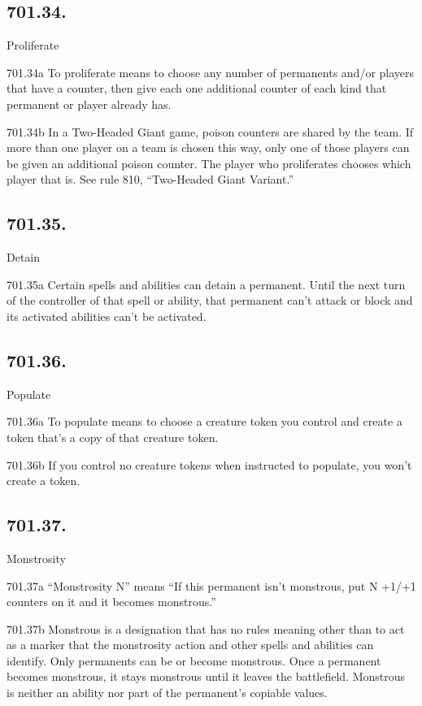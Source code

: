 \subsection*{701.34.}
Proliferate

701.34a To proliferate means to choose any number of permanents and/or players that have a counter, then give each one additional counter of each kind that permanent or player already has.

701.34b In a Two-Headed Giant game, poison counters are shared by the team. If more than one player on a team is chosen this way, only one of those players can be given an additional poison counter. The player who proliferates chooses which player that is. See rule 810, “Two-Headed Giant Variant.”

\subsection*{701.35.}
Detain

701.35a Certain spells and abilities can detain a permanent. Until the next turn of the controller of that spell or ability, that permanent can’t attack or block and its activated abilities can’t be activated.

\subsection*{701.36.}
Populate

701.36a To populate means to choose a creature token you control and create a token that’s a copy of that creature token.

701.36b If you control no creature tokens when instructed to populate, you won’t create a token.

\subsection*{701.37.}
Monstrosity

701.37a “Monstrosity N” means “If this permanent isn’t monstrous, put N +1/+1 counters on it and it becomes monstrous.”

701.37b Monstrous is a designation that has no rules meaning other than to act as a marker that the monstrosity action and other spells and abilities can identify. Only permanents can be or become monstrous. Once a permanent becomes monstrous, it stays monstrous until it leaves the battlefield. Monstrous is neither an ability nor part of the permanent’s copiable values.

